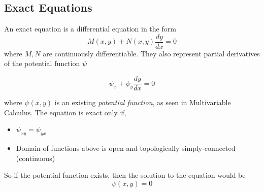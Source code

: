 
\subsection{Exact Equations}

An exact equation is a differential equation in the form
\[
    M(x, y) + N(x, y)\frac{dy}{dx} = 0
\]
where $M, N$ are continuously differentiable. They also represent partial derivatives of the potential function $\psi$

\[
    \psi_x + \psi_y\frac{dy}{dx} = 0
\]

where $\psi(x, y)$ is an existing \textit{potential function}, as seen in Multivariable Calculus. The equation is exact only if,
\begin{itemize}
    \item $\psi_{xy} = \psi_{yx}$
    \item Domain of functions above is open and topologically simply-connected (continuous)
\end{itemize}

So if the potential function exists, then the solution to the equation would be
\[
    \psi(x, y) = 0
\]